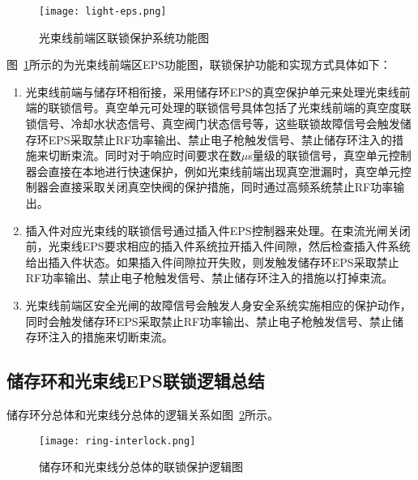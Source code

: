 \begin{figure}[!htb]
	\centering
	\texttt{[image: light-eps.png]}
	\caption{光束线前端区联锁保护系统功能图}
	\label{fig:light-eps}
\end{figure}

图~\ref{fig:light-eps}所示的为光束线前端区EPS功能图，联锁保护功能和实现方式具体如下：

\begin{enumerate}
  \item 光束线前端与储存环相衔接，采用储存环EPS的真空保护单元来处理光束线前端的联锁信号。真空单元可处理的联锁信号具体包括了光束线前端的真空度联锁信号、冷却水状态信号、真空阀门状态信号等，这些联锁故障信号会触发储存环EPS采取禁止RF功率输出、禁止电子枪触发信号、禁止储存环注入的措施来切断束流。同时对于响应时间要求在数$\mu$s量级的联锁信号，真空单元控制器会直接在本地进行快速保护，例如光束线前端出现真空泄漏时，真空单元控制器会直接采取关闭真空快阀的保护措施，同时通过高频系统禁止RF功率输出。

  \item 插入件对应光束线的联锁信号通过插入件EPS控制器来处理。在束流光闸关闭前，光束线EPS要求相应的插入件系统拉开插入件间隙，然后检查插入件系统给出插入件状态。如果插入件间隙拉开失败，则发触发储存环EPS采取禁止RF功率输出、禁止电子枪触发信号、禁止储存环注入的措施以打掉束流。

  \item 光束线前端区安全光闸的故障信号会触发人身安全系统实施相应的保护动作，同时会触发储存环EPS采取禁止RF功率输出、禁止电子枪触发信号、禁止储存环注入的措施来切断束流。


\end{enumerate}

\subsection{储存环和光束线EPS联锁逻辑总结}

储存环分总体和光束线分总体的逻辑关系如图~\ref{fig:ring-interlock}所示。

\begin{figure}[!htb]
	\centering
	\texttt{[image: ring-interlock.png]}
	\caption{储存环和光束线分总体的联锁保护逻辑图}
	\label{fig:ring-interlock}
\end{figure}

